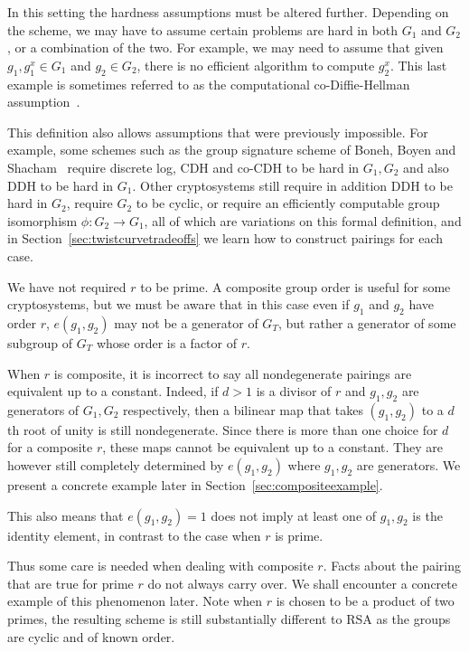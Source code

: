 In this setting the hardness assumptions must be altered further.
Depending on the scheme, we may have to assume certain problems are hard in
both $G_1$ and $G_2$, or a combination of the two. For example, we may
need to assume that given $g_1, g_1^x \in G_1$ and $g_2 \in G_2$,
there is no efficient algorithm to compute $g_2^x$. This last
example is sometimes referred to as
the computational co-Diffie-Hellman assumption~\cite{bls}.

This definition also allows assumptions that were previously
impossible. For example, some schemes such as the group signature scheme
of Boneh, Boyen and Shacham~\cite{bbs} require discrete log, CDH and
co-CDH to be hard in $G_1, G_2$ and also DDH to be hard in $G_1$.
Other cryptosystems still require in addition
DDH to be hard in $G_2$, require $G_2$ to be cyclic,
or require an efficiently computable
group isomorphism $\phi:G_2 \rightarrow G_1$, all of which are variations
on this formal definition, and in Section~\ref{sec:twistcurvetradeoffs}
we learn how to construct pairings for each case.

We have not required $r$ to be prime. A composite group
order is useful for some cryptosystems\cite{bgn},
but we must be aware that in this case even if $g_1$ and $g_2$ have order
$r$, $e(g_1, g_2)$ may not be a generator of $G_T$, but rather a generator
of some subgroup of $G_T$ whose order is a factor of $r$.

When $r$ is composite, it is incorrect to say all nondegenerate pairings are
equivalent up to a constant. Indeed, if $d > 1$ is a divisor of $r$
and $g_1, g_2$ are generators of $G_1, G_2$ respectively, then a bilinear map
that takes $(g_1, g_2)$ to a $d$th root of unity is still nondegenerate.
Since there is more than one choice for $d$ for a composite $r$,
these maps cannot be equivalent up to a constant. They are however still
completely determined by $e(g_1, g_2)$ where $g_1, g_2$ are generators.
We present a concrete example later in Section~\ref{sec:compositeexample}.

This also means that $e(g_1, g_2) = 1$ does not imply at least
one of $g_1, g_2$ is the identity element, in contrast to the case when
$r$ is prime.

Thus some care is needed when dealing with composite $r$.
Facts about the pairing that are true for prime $r$ do not always carry over.
We shall encounter a concrete example of this phenomenon later.
Note when $r$ is chosen to be a product of two primes, the resulting scheme
is still substantially different to RSA as the groups are cyclic and of
known order.

